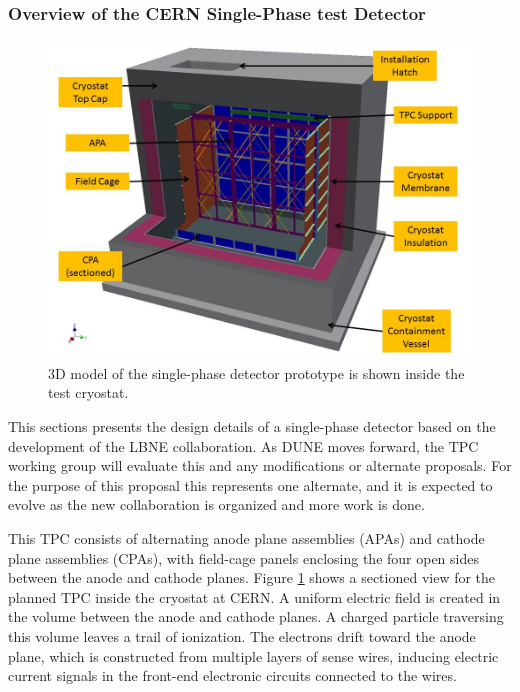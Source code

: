 \subsubsection{Overview of the CERN Single-Phase test Detector}
\begin{figure}[htb]
\centering
\begin{minipage}[b]{1.0\textwidth}
\begin{center}
\includegraphics[width=.75\textwidth]{./figures/TPC-3D-section.jpg}
\end{center}
\end{minipage}
\caption{\small 3D model of the single-phase detector prototype is shown inside the test cryostat.}
\label{fig:CERNdet-overview}
\end{figure}

This sections presents the design details of a single-phase detector based on the development of the LBNE collaboration. As DUNE moves forward, the TPC working group will evaluate this and any modifications or alternate proposals. For the purpose of this proposal this represents one alternate, and it is expected to evolve as the new collaboration is organized and more work is done. 

This TPC consists of alternating anode plane assemblies (APAs) and cathode plane assemblies (CPAs), with field-cage panels enclosing the four open sides between the anode and cathode planes.  Figure  \ref{fig:CERNdet-overview} shows a sectioned view for the planned TPC inside the cryostat at CERN.  A uniform electric field is created in the volume between the anode and cathode planes. A charged particle traversing this volume leaves a trail of ionization. The electrons drift toward the anode plane, which is constructed from multiple layers of sense wires, inducing electric current signals in the front-end electronic circuits connected to the wires.

